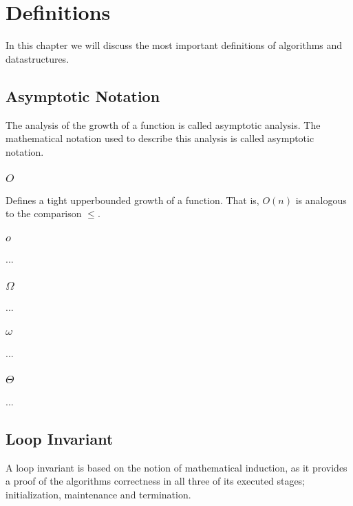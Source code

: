 
\thispagestyle{fancyplain}

\chapter{Definitions}
\label{ch:definitions}
In this chapter we will discuss the most important definitions of algorithms
and datastructures.

\section{Asymptotic Notation}
\label{ch:definitions|sec:asymptotic-notation}
The analysis of the growth of a function is called asymptotic analysis. The
mathematical notation used to describe this analysis is called asymptotic
notation.

\subsection{$O$}
\label{ch:definitions|sec:asymptotic-notation|sub:big-o}
Defines a tight upperbounded growth of a function. That is, $O(n)$ is
analogous to the comparison $\leq$.

\subsection{$o$}
\label{ch:definitions|sec:asymptotic-notation|sub:little-o}
...

\subsection{$\Omega$}
\label{ch:definitions|sec:asymptotic-notation|sub:big-omega}
...

\subsection{$\omega$}
\label{ch:definitions|sec:asymptotic-notation|sub:litte-omega}
...

\subsection{$\Theta$}
\label{ch:definitions|sec:asymptotic-notation|sub:theta}
...

\section{Loop Invariant}
\label{ch:definitions|sec:loop-invariant}
A loop invariant is based on the notion of mathematical induction, as it
provides a proof of the algorithms correctness in all three of its executed
stages; initialization, maintenance and termination.

